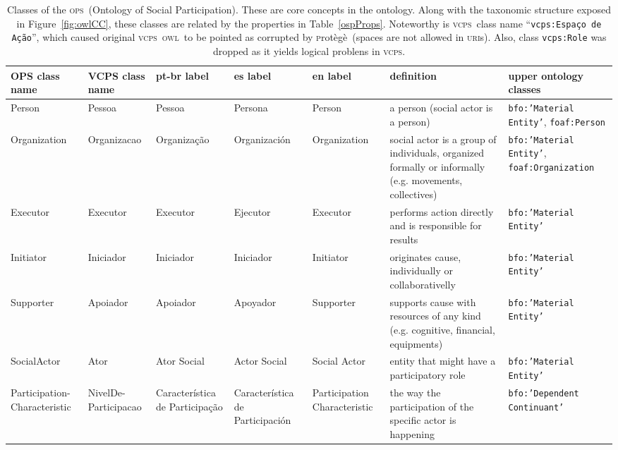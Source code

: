 \documentclass[10pt,letterpaper]{article}
\newcommand{\ops}{\textsc{ops}}
\newcommand{\vcps}{\textsc{vcps}}
\newcommand{\owl}{\textsc{owl}}
\newcommand{\uri}{\textsc{uri}}
\newcommand{\protege}{\textsc{p}rot\`eg\`e}
\begin{document}
\begin{table}[!h]
\begin{adjustwidth}{-2.25in}{0in} %
    \footnotesize
  \centering
  \caption{Classes of the \ops\ (Ontology of Social Participation). These are core concepts in the ontology. Along with the taxonomic structure exposed in Figure~\ref{fig:owlCC}, these classes are related by the properties in Table~\ref{ospProps}. Noteworthy is \vcps\ class name ``{\tt vcps:Espa\c{c}o de A\c{c}\~ao}'', which caused original \vcps\ \owl\ to be pointed as corrupted by \protege\ (spaces are not allowed in \uri s). Also, class {\tt vcps:Role} was dropped as it yields logical problens in \vcps.}
  \begin{tabular}{|p{1.8cm}|p{1.6cm}||p{2.2cm}|p{2.2cm}|p{1.8cm}||p{4cm}||p{3cm}|}\hline
      {\bf OPS class name} & {\bf VCPS class name} & {\bf pt-br label} & {\bf es label} & {\bf en label} & {\bf definition} & {\bf upper ontology classes} \\\hline\hline
      Person & Pessoa & Pessoa & Persona & Person & a person (social actor is a person) & {\tt bfo:'Material Entity'}, {\tt foaf:Person} \\ \hline
      Organization & Organizacao & Organiza\c{c}\~ao & Organizaci\'on & Organization & social actor is a group of individuals, organized formally or informally (e.g. movements, collectives) & {\tt bfo:'Material Entity'}, {\tt foaf:Organization} \\ \hline \hline
Executor & Executor & Executor & Ejecutor & Executor & performs action directly and is responsible for results & {\tt bfo:'Material Entity'} \\ \hline
Initiator & Iniciador & Iniciador & Iniciador & Initiator & originates cause, individually or collaborativelly & {\tt bfo:'Material Entity'} \\ \hline
      Supporter & Apoiador & Apoiador & Apoyador & Supporter & supports cause with resources of any kind (e.g. cognitive, financial, equipments) & {\tt bfo:'Material Entity'} \\ \hline
SocialActor & Ator & Ator Social & Actor Social & Social Actor & entity that might have a participatory role & {\tt bfo:'Material Entity'} \\ \hline \hline
Participation-Characteristic & NivelDe-Participacao & Caracter\'istica de Participa\c{c}\~ao & Caracter\'istica de Participaci\'on & Participation Characteristic & the way the participation of the specific actor is happening & {\tt bfo:'Dependent Continuant'} \\\hline

\end{tabular}
\end{adjustwidth}
\end{table}
\end{document}
